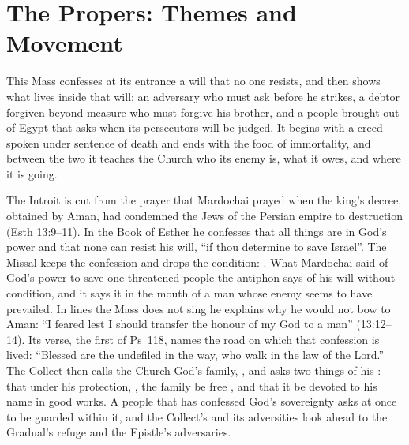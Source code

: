 
\section{The Propers: Themes and Movement}

This Mass confesses at its entrance a will that no one resists, and then shows
what lives inside that will: an adversary who must ask before he strikes, a
debtor forgiven beyond measure who must forgive his brother, and a people
brought out of Egypt that asks when its persecutors will be judged. It begins
with a creed spoken under sentence of death and ends with the food of
immortality, and between the two it teaches the Church who its enemy is, what it
owes, and where it is going.

The Introit is cut from the prayer that Mardochai prayed when the king's decree,
obtained by Aman, had condemned the Jews of the Persian empire to destruction
(Esth 13:9--11). In the Book of Esther he confesses that all things are in God's
power and that none can resist his will, ``if thou determine to save Israel''.
The Missal keeps the confession and drops the condition: . What Mardochai said of God's power to save one threatened people the
antiphon says of his will without condition, and it says it in the mouth of a
man whose enemy seems to have prevailed. In lines the Mass does not sing he
explains why he would not bow to Aman: ``I feared lest I should transfer the
honour of my God to a man'' (13:12--14). Its verse, the first of Ps~118, names
the road on which that confession is lived: ``Blessed are the undefiled in the
way, who walk in the law of the Lord.'' The Collect then calls the Church God's
family, , and asks two things of his : that under his protection, , the family be free
, and that it be devoted to his name in good
works. A people that has confessed God's sovereignty asks at once to be guarded
within it, and the Collect's  and its adversities look
ahead to the Gradual's refuge and the Epistle's adversaries.

